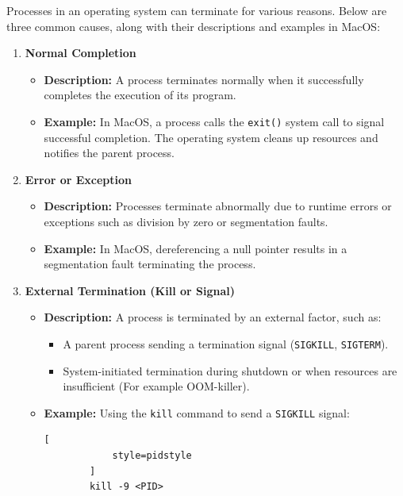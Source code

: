 \documentclass{article}
\begin{document}
\begin{enumerate}[label=\textbf{\alph*})]
    Processes in an operating system can terminate for various reasons.
    Below are three common causes, along with their descriptions and examples in MacOS:

\begin{enumerate}[label=\textbf{\arabic*.}]
    \item \textbf{Normal Completion}
    \begin{itemize}
        \item \textbf{Description:} A process terminates normally when
        it successfully completes the execution of its program.
        \item \textbf{Example:} In MacOS, a process calls the \texttt{exit()}
        system call to signal successful completion. The operating system cleans
        up resources and notifies the parent process.
    \end{itemize}

    \item \textbf{Error or Exception}
    \begin{itemize}
        \item \textbf{Description:} Processes terminate abnormally due to
        runtime errors or exceptions such as division by zero or segmentation faults.
        \item \textbf{Example:} In MacOS, dereferencing a null pointer results
        in a segmentation fault terminating the process.
    \end{itemize}

    \item \textbf{External Termination (Kill or Signal)}
    \begin{itemize}
        \item \textbf{Description:} A process is terminated by an external factor, such as:
        \begin{itemize}
            \item A parent process sending a termination signal (\texttt{SIGKILL}, \texttt{SIGTERM}).
            \item System-initiated termination during shutdown or when resources are insufficient (For example OOM-killer).
        \end{itemize}
        \item \textbf{Example:} Using the \texttt{kill} command to send a \texttt{SIGKILL} signal:
        \begin{lstlisting}[
            style=pidstyle
        ]
        kill -9 <PID>
        \end{lstlisting}
    \end{itemize}
\end{enumerate}
\end{enumerate}
\end{document}

